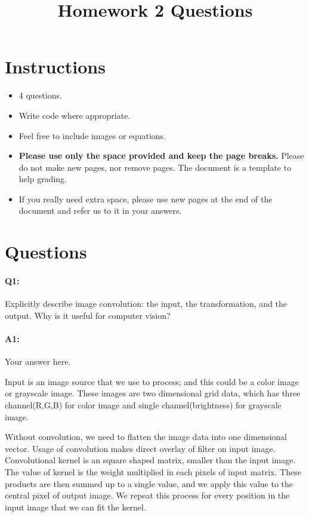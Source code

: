 \title{\vspace{-1cm}Homework 2 Questions}



	\maketitle
	\vspace{-3cm}
	\thispagestyle{fancy}
	
	\section*{Instructions}
	\begin{itemize}
		\item 4 questions.
		\item Write code where appropriate.
		\item Feel free to include images or equations.
		\item \textbf{Please use only the space provided and keep the page breaks.} Please do not make new pages, nor remove pages. The document is a template to help grading.
		\item If you really need extra space, please use new pages at the end of the document and refer us to it in your answers.
	\end{itemize}

	\section*{Questions}
	
	\paragraph{Q1:} Explicitly describe image convolution: the input, the transformation, and the output. Why is it useful for computer vision?
	
	\paragraph{A1:} Your answer here.
	
	Input is an image source that we use to process; and this could be a color image or grayscale image. These images are two dimensional grid data, which has three channel(R,G,B) for color image and single channel(brightness) for grayscale image.

	Without convolution, we need to flatten the image data into one dimensional vector. Usage of convolution makes direct overlay of filter on input image. Convolutional kernel is an square shaped matrix, smaller than the input image. The value of kernel is the weight multiplied in each pixels of input matrix. These products are then summed up to a single value, and we apply this value to the central pixel of output image. We repeat this process for every position in the input image that we can fit the kernel.

